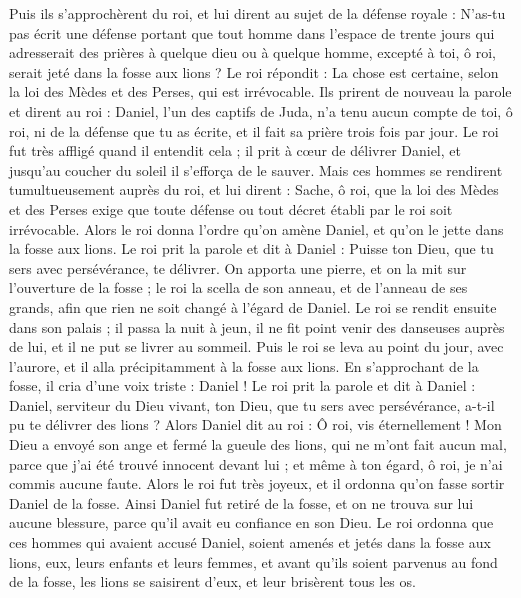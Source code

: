 \begin{multicols}{2}
Puis ils s'approchèrent du roi, et lui dirent au sujet de la défense royale : N'as-tu pas écrit une défense portant que tout homme dans l’espace de trente jours qui adresserait des prières à quelque dieu ou à quelque homme, excepté à toi, ô roi, serait jeté dans la fosse aux lions ? Le roi répondit : La chose est certaine, selon la loi des Mèdes et des Perses, qui est irrévocable.
Ils prirent de nouveau la parole et dirent au roi : Daniel, l’un des captifs de Juda, n'a tenu aucun compte de toi, ô roi,  ni de la défense que tu as écrite, et il fait sa prière trois fois par jour.
Le roi fut très affligé quand il entendit cela ; il prit à cœur de délivrer Daniel, et jusqu’au coucher du soleil il s’efforça de le sauver.
Mais ces hommes se rendirent tumultueusement auprès du roi, et lui dirent : Sache, ô roi, que la loi des Mèdes et des Perses exige que toute défense ou tout décret établi par le roi soit irrévocable.
Alors le roi donna l’ordre qu'on amène Daniel, et qu'on le jette dans la fosse aux lions. Le roi prit la parole et dit à Daniel : Puisse ton Dieu, que tu sers avec persévérance, te délivrer.
On apporta une pierre, et on la mit sur l'ouverture de la fosse ; le roi la scella de son anneau, et de l'anneau de ses grands, afin que rien ne soit changé à l’égard de Daniel.
Le roi se rendit ensuite dans son palais ; il passa la nuit à jeun, il ne fit point venir des danseuses auprès de lui, et il ne put se livrer au sommeil.
Puis le roi se leva au point du jour, avec l’aurore, et il alla précipitamment à la fosse aux lions.
En s’approchant de la fosse, il cria d'une voix triste : Daniel ! Le roi prit la parole et dit à Daniel : Daniel, serviteur du Dieu vivant, ton Dieu, que tu sers avec persévérance, a-t-il pu te délivrer des lions ?
Alors Daniel dit au roi : Ô roi, vis éternellement !
Mon Dieu a envoyé son ange et fermé la gueule des lions, qui ne m'ont fait aucun mal, parce que j'ai été trouvé innocent devant lui ; et même à ton égard, ô roi,  je n'ai commis aucune faute.
Alors le roi fut très joyeux, et il ordonna qu'on fasse sortir Daniel de la fosse. Ainsi Daniel fut retiré de la fosse, et on ne trouva sur lui aucune blessure, parce qu'il avait eu confiance en son Dieu.
Le roi ordonna que ces hommes qui avaient accusé Daniel, soient amenés et jetés dans la fosse aux lions, eux, leurs enfants et leurs femmes, et avant qu'ils soient parvenus au fond de la fosse, les lions se saisirent d'eux, et leur brisèrent tous les os.

\end{multicols}
